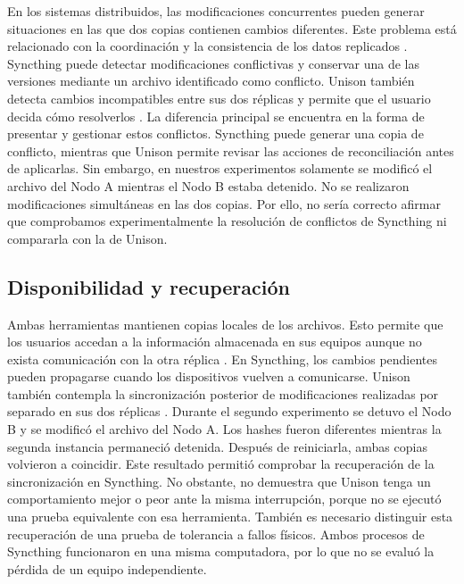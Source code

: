 \documentclass[12pt,a4paper]{article}
\begin{document}
En los sistemas distribuidos, las modificaciones concurrentes pueden generar situaciones en las que dos copias contienen cambios diferentes. 
Este problema está relacionado con la coordinación y la consistencia de los datos replicados \cite{ahmed2023}.
Syncthing puede detectar modificaciones conflictivas y conservar una de las versiones mediante un archivo identificado como conflicto. Unison también detecta cambios incompatibles entre sus dos 
réplicas y permite que el usuario decida cómo resolverlos \cite{syncthingSyncing,unisonOfficial}.
La diferencia principal se encuentra en la forma de presentar y gestionar estos conflictos. Syncthing puede generar una copia de conflicto, mientras que Unison 
permite revisar las acciones de reconciliación antes de aplicarlas.
Sin embargo, en nuestros experimentos solamente se modificó el archivo del Nodo A mientras el 
Nodo B estaba detenido. No se realizaron modificaciones simultáneas en las dos copias. Por ello, no sería correcto afirmar que comprobamos experimentalmente la resolución de conflictos de Syncthing ni compararla con la de Unison.

\subsection{Disponibilidad y recuperación}

Ambas herramientas mantienen copias locales de los archivos. Esto permite que los usuarios accedan a la información almacenada en sus equipos aunque 
no exista comunicación con la otra réplica \cite{syncthingFAQ,unisonOfficial}.
En Syncthing, los cambios pendientes pueden propagarse cuando los dispositivos vuelven a comunicarse. Unison también contempla la 
sincronización posterior de modificaciones realizadas por separado en sus dos réplicas \cite{syncthingSyncing,unisonOfficial}.
Durante el segundo experimento se detuvo el Nodo B y se modificó el archivo del Nodo A. Los hashes fueron diferentes mientras la segunda instancia permaneció detenida. 
Después de reiniciarla, ambas copias volvieron a coincidir.
Este resultado permitió comprobar la recuperación de la sincronización en Syncthing. No obstante, no demuestra que Unison tenga un comportamiento mejor o peor ante la misma interrupción, porque no se ejecutó una prueba equivalente con esa herramienta.
También es necesario distinguir esta recuperación de una prueba de tolerancia a fallos físicos. Ambos procesos de Syncthing 
funcionaron en una misma computadora, por lo que no se evaluó la pérdida de un equipo independiente.
\end{document}
